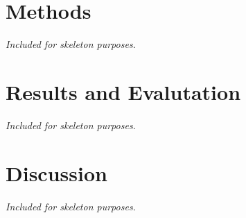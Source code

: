 \documentclass[a4paper,12pt]{article}
\begin{document}
\newpage
\section{ Methods } \label{sec:methods}
\textit{Included for skeleton purposes.}

\newpage

\section{ Results and Evalutation } \label{sec:results}
\textit{Included for skeleton purposes.}

\newpage

\section{ Discussion } \label{sec:discussion}
\textit{Included for skeleton purposes.} 

\newpage



\end{document}
